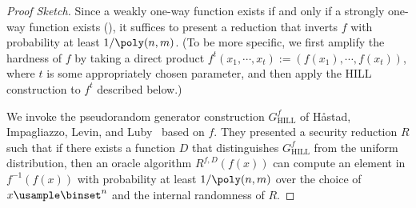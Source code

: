 \documentclass{toc}
\begin{document}
\begin{proof}
  [Proof Sketch]
  Since a weakly one-way function exists if and only if a strongly one-way function exists (\cite{Yao82a_focs_conf}),
  it suffices to present a reduction that inverts $f$ with probability at least $1  / \poly(n, m)$.
  (To be more specific,
  we first amplify the hardness of $f$ by taking a direct product
  $f^t(x_1, \cdots, x_t) := (f(x_1), \cdots, f(x_t))$,
  where $t$ is some appropriately chosen parameter, and
  then apply the HILL construction to $f^t$ described below.)

  We invoke the pseudorandom generator construction $G_\mathrm{HILL}^{f}$ of
  H{\aa}stad, Impagliazzo, Levin, and Luby~\cite{HastadILL99_siamcomp_journals}
  based on $f$.
  They presented a security reduction $R$
  such
  that
  if there exists a function $D$ that distinguishes $G_\mathrm{HILL}^{f}$ from
  the uniform distribution,
  then an oracle algorithm $R^{f, D}(f({x}))$ can compute an element in $f^{-1}(f({x}))$
  with probability at least $1 / \poly(n, m)$ over the choice of $x \usample \binset^{n}$ and the
  internal randomness of $R$.
\end{proof}
\end{document}
